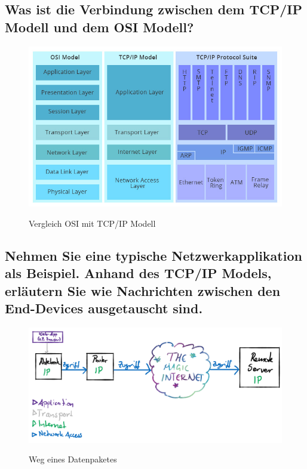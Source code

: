 \subsection*{Was ist die Verbindung zwischen dem TCP/IP Modell und dem OSI Modell?}\label{sub:VerbindungTCPundOSIModell}
\begin{figure}[H]
    \begin{center}
    \label{pic:osi_tcpip}
    \includegraphics[width=\textwidth]{images/osi_tcpip.jpg}
    \caption[Vergleich OSI mit TCP/IP Modell]{Vergleich OSI mit TCP/IP Modell\cite{FSDeutschland}}
    \end{center}
\end{figure}

\subsection*{Nehmen Sie eine typische Netzwerkapplikation als Beispiel. Anhand des TCP/IP Models, erläutern Sie wie Nachrichten zwischen den End-Devices ausgetauscht sind.}\label{sub:BeispielNetzwerkapplikation}
\begin{figure}[H]
    \begin{center}
    \label{pic:tcp1}
    \includegraphics[width=\textwidth]{images/Nachrichtenaustausch01.png}
    \caption{Weg eines Datenpaketes}
    \end{center}
\end{figure}

